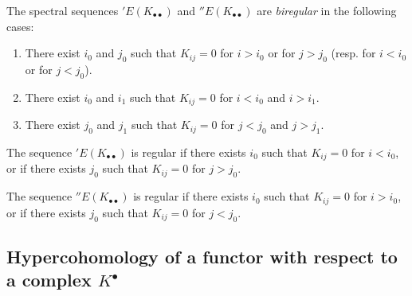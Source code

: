 \begin{env}[11.3.6]
\label{0.11.3.6}
The spectral sequences $'E(K_{\bullet\bullet})$ and
$''E(K_{\bullet\bullet})$ are \emph{biregular} in the following cases:
\begin{enumerate}
  \item[(a)] There exist $i_0$ and $j_0$ such that $K_{ij}=0$ for $i>i_0$ or
    for $j>j_0$ (resp. for $i<i_0$
    or for $j<j_0$).
  \item[(b)] There exist $i_0$ and $i_1$ such that $K_{ij}=0$ for $i<i_0$ and
    $i>i_1$.
  \item[(c)] There exist $j_0$ and $j_1$ such that $K_{ij}=0$ for $j<j_0$ and
    $j>j_1$.
\end{enumerate}

The sequence $'E(K_{\bullet\bullet})$ is regular if there exists $i_0$ such that
$K_{ij}=0$ for $i<i_0$, or if there exists $j_0$ such that $K_{ij}=0$ for
$j>j_0$.

The sequence $''E(K_{\bullet\bullet})$ is regular if there exists $i_0$ such that
$K_{ij}=0$ for $i>i_0$, or if there exists $j_0$ such that $K_{ij}=0$ for
$j<j_0$.
\end{env}


\subsection{Hypercohomology of a functor with respect to a complex
$K^\bullet$}
\label{subsection:0.11.4}

